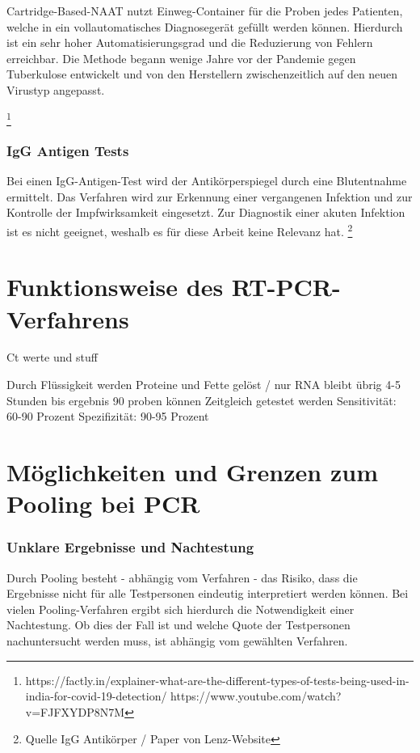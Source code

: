 Cartridge-Based-NAAT nutzt Einweg-Container für die Proben jedes Patienten, welche in ein vollautomatisches Diagnosegerät gefüllt werden können. Hierdurch ist ein sehr hoher Automatisierungsgrad und die Reduzierung von Fehlern erreichbar. Die Methode begann wenige Jahre vor der Pandemie gegen Tuberkulose entwickelt und von den Herstellern zwischenzeitlich auf den neuen Virustyp angepasst.

\footnote{https://factly.in/explainer-what-are-the-different-types-of-tests-being-used-in-india-for-covid-19-detection/  https://www.youtube.com/watch?v=FJFXYDP8N7M}

\subsubsection{IgG Antigen Tests}
Bei einen IgG-Antigen-Test wird der Antikörperspiegel durch eine Blutentnahme ermittelt.
Das Verfahren wird zur Erkennung einer vergangenen Infektion und zur Kontrolle der Impfwirksamkeit eingesetzt.
Zur Diagnostik einer akuten Infektion ist es nicht geeignet, weshalb es für diese Arbeit keine Relevanz hat.
\footnote{Quelle IgG Antikörper / Paper von Lenz-Website}


\cleardoublepage
\section{Funktionsweise des RT-PCR-Verfahrens}
Ct werte und stuff

Durch Flüssigkeit werden Proteine und Fette gelöst / nur RNA bleibt übrig
4-5 Stunden bis ergebnis
90 proben können Zeitgleich getestet werden
Sensitivität: 60-90 Prozent
Spezifizität: 90-95 Prozent

\cleardoublepage

\section{Möglichkeiten und Grenzen zum Pooling bei PCR}
\subsubsection{Unklare Ergebnisse und Nachtestung}
Durch Pooling besteht - abhängig vom Verfahren - das Risiko, dass die Ergebnisse nicht für alle Testpersonen eindeutig interpretiert werden können.
Bei vielen Pooling-Verfahren ergibt sich hierdurch die Notwendigkeit einer Nachtestung.
Ob dies der Fall ist und welche Quote der Testpersonen nachuntersucht werden muss, ist abhängig vom gewählten Verfahren.

